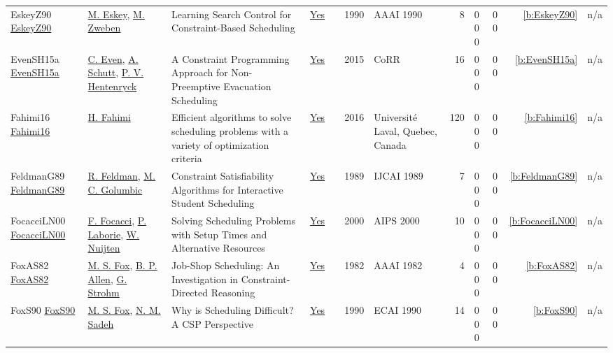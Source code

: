 {\begin{longtable}{>{\raggedright\arraybackslash}p{3cm}>{\raggedright\arraybackslash}p{4.5cm}>{\raggedright\arraybackslash}p{6.0cm}rrrp{2.5cm}rp{1cm}p{1cm}rr}
EskeyZ90 \href{http://www.aaai.org/Library/AAAI/1990/aaai90-136.php}{EskeyZ90} & \hyperref[auth:a1274]{M. Eskey}, \hyperref[auth:a1275]{M. Zweben} & Learning Search Control for Constraint-Based Scheduling & \href{../works/EskeyZ90.pdf}{Yes} & \cite{EskeyZ90} & 1990 & AAAI 1990 & 8 & 0 0 0 & 0 0 & \ref{b:EskeyZ90} & n/a\\
EvenSH15a \href{http://arxiv.org/abs/1505.02487}{EvenSH15a} & \hyperref[auth:a214]{C. Even}, \hyperref[auth:a124]{A. Schutt}, \hyperref[auth:a148]{P. V. Hentenryck} & A Constraint Programming Approach for Non-Preemptive Evacuation Scheduling & \href{../works/EvenSH15a.pdf}{Yes} & \cite{EvenSH15a} & 2015 & CoRR & 16 & 0 0 0 & 0 0 & \ref{b:EvenSH15a} & n/a\\
Fahimi16 \href{http://cp2014.a4cp.org/sites/default/files/hamed_fahimi_-_efficient_algorithms_to_solve_scheduling_problems_with_a_variety_of_optimization_criteria.pdf}{Fahimi16} & \hyperref[auth:a122]{H. Fahimi} & Efficient algorithms to solve scheduling problems with a variety of optimization criteria & \href{../works/Fahimi16.pdf}{Yes} & \cite{Fahimi16} & 2016 & Universit{\'{e}} Laval, Quebec, Canada & 120 & 0 0 0 & 0 0 & \ref{b:Fahimi16} & n/a\\
FeldmanG89 \href{http://ijcai.org/Proceedings/89-2/Papers/026.pdf}{FeldmanG89} & \hyperref[auth:a1436]{R. Feldman}, \hyperref[auth:a1437]{M. C. Golumbic} & Constraint Satisfiability Algorithms for Interactive Student Scheduling & \href{../works/FeldmanG89.pdf}{Yes} & \cite{FeldmanG89} & 1989 & IJCAI 1989 & 7 & 0 0 0 & 0 0 & \ref{b:FeldmanG89} & n/a\\
FocacciLN00 \href{http://www.aaai.org/Library/AIPS/2000/aips00-010.php}{FocacciLN00} & \hyperref[auth:a776]{F. Focacci}, \hyperref[auth:a118]{P. Laborie}, \hyperref[auth:a656]{W. Nuijten} & Solving Scheduling Problems with Setup Times and Alternative Resources & \href{../works/FocacciLN00.pdf}{Yes} & \cite{FocacciLN00} & 2000 & AIPS 2000 & 10 & 0 0 0 & 0 0 & \ref{b:FocacciLN00} & n/a\\
FoxAS82 \href{http://www.aaai.org/Library/AAAI/1982/aaai82-037.php}{FoxAS82} & \hyperref[auth:a302]{M. S. Fox}, \hyperref[auth:a1006]{B. P. Allen}, \hyperref[auth:a1007]{G. Strohm} & Job-Shop Scheduling: An Investigation in Constraint-Directed Reasoning & \href{../works/FoxAS82.pdf}{Yes} & \cite{FoxAS82} & 1982 & AAAI 1982 & 4 & 0 0 0 & 0 0 & \ref{b:FoxAS82} & n/a\\
FoxS90 \href{}{FoxS90} & \hyperref[auth:a302]{M. S. Fox}, \hyperref[auth:a1044]{N. M. Sadeh} & Why is Scheduling Difficult? {A} {CSP} Perspective & \href{../works/FoxS90.pdf}{Yes} & \cite{FoxS90} & 1990 & ECAI 1990 & 14 & 0 0 0 & 0 0 & \ref{b:FoxS90} & n/a\\

\end{longtable}}
